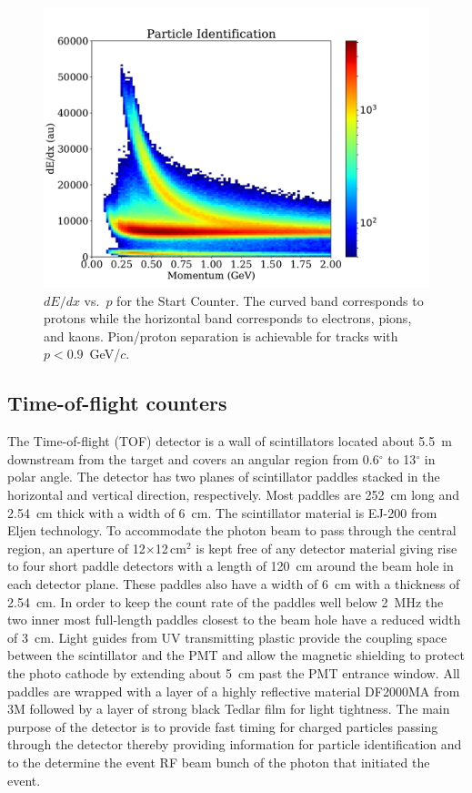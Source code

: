 \begin{figure}[!htb]
  \centering
  \includegraphics[width=\textwidth]{figures/st_dedx_vs_p.pdf}
  \caption{$dE/dx$ vs.\ $p$ for the Start Counter.  The curved band
    corresponds to protons while the horizontal band corresponds to
    electrons, pions, and kaons. Pion/proton separation is achievable
    for tracks with $p < 0.9$~GeV/$c$.}\label{fig:ST_dEdx_vs_p}
\end{figure}

\subsection[Time-of-flight counters (Beni)]{Time-of-flight counters \label{sec:tof}}
The Time-of-flight (TOF) detector is a wall of scintillators located about 5.5~m downstream from the target and covers 
an angular region from 0.6$^{\circ}$ to 13$^{\circ}$ in polar angle. The detector has two planes of
scintillator paddles stacked in the horizontal and vertical direction, respectively. Most paddles are 252~cm long and 2.54~cm
thick with a width of 6~cm. 
The scintillator material is EJ-200 from Eljen technology.
To accommodate the photon beam to pass through the central region,
an aperture of 12$\times$12\,cm$^2$ is kept
free of any detector material giving rise to four short paddle detectors with a length of 120~cm around the beam hole
in each detector plane. These paddles also have a width of 6~cm with a thickness of 2.54~cm. In order to keep the
count rate of the paddles well below 2~MHz the two inner most full-length paddles closest to the beam hole have a reduced width of 3~cm.
Light guides from UV transmitting plastic provide the coupling space between the scintillator and the PMT and allow the 
magnetic shielding to protect the photo cathode by extending about 5~cm past the PMT entrance window. All paddles are wrapped
with a layer of a highly reflective material DF2000MA from 3M followed by a layer of strong black Tedlar film for light tightness. 
The main purpose of the detector is to provide fast timing for charged particles passing through the detector thereby providing information for particle identification and to the determine the event RF beam bunch of the photon that initiated the event.

